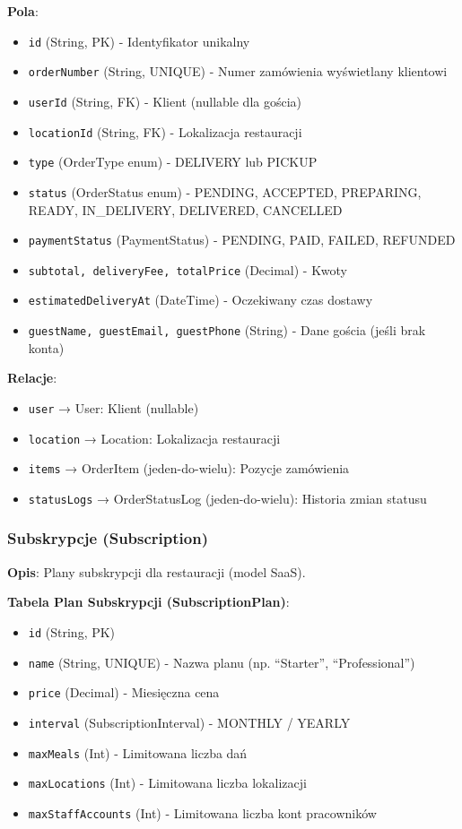 \documentclass[12pt,a4paper,utf-8]{article}
\begin{document}
\textbf{Pola}:
\begin{itemize}
    \item \texttt{id} (String, PK) - Identyfikator unikalny
    \item \texttt{orderNumber} (String, UNIQUE) - Numer zamówienia wyświetlany klientowi
    \item \texttt{userId} (String, FK) - Klient (nullable dla gościa)
    \item \texttt{locationId} (String, FK) - Lokalizacja restauracji
    \item \texttt{type} (OrderType enum) - DELIVERY lub PICKUP
    \item \texttt{status} (OrderStatus enum) - PENDING, ACCEPTED, PREPARING, READY, IN\_DELIVERY, DELIVERED, CANCELLED
    \item \texttt{paymentStatus} (PaymentStatus) - PENDING, PAID, FAILED, REFUNDED
    \item \texttt{subtotal, deliveryFee, totalPrice} (Decimal) - Kwoty
    \item \texttt{estimatedDeliveryAt} (DateTime) - Oczekiwany czas dostawy
    \item \texttt{guestName, guestEmail, guestPhone} (String) - Dane gościa (jeśli brak konta)
\end{itemize}

\textbf{Relacje}:
\begin{itemize}
    \item \texttt{user} → User: Klient (nullable)
    \item \texttt{location} → Location: Lokalizacja restauracji
    \item \texttt{items} → OrderItem (jeden-do-wielu): Pozycje zamówienia
    \item \texttt{statusLogs} → OrderStatusLog (jeden-do-wielu): Historia zmian statusu
\end{itemize}

\subsubsection{Subskrypcje (Subscription)}

\textbf{Opis}: Plany subskrypcji dla restauracji (model SaaS).

\textbf{Tabela Plan Subskrypcji (SubscriptionPlan)}:
\begin{itemize}
    \item \texttt{id} (String, PK)
    \item \texttt{name} (String, UNIQUE) - Nazwa planu (np. ``Starter'', ``Professional'')
    \item \texttt{price} (Decimal) - Miesięczna cena
    \item \texttt{interval} (SubscriptionInterval) - MONTHLY / YEARLY
    \item \texttt{maxMeals} (Int) - Limitowana liczba dań
    \item \texttt{maxLocations} (Int) - Limitowana liczba lokalizacji
    \item \texttt{maxStaffAccounts} (Int) - Limitowana liczba kont pracowników
\end{itemize}
\end{document}
